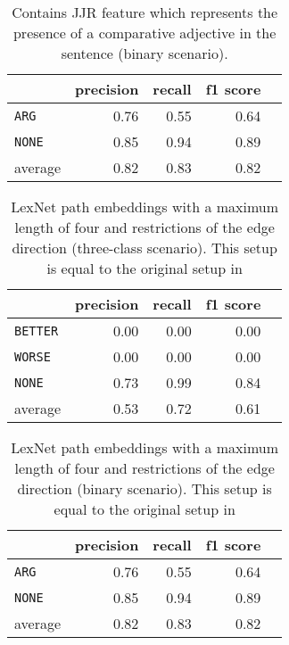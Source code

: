 \begin{table}[h] 
	\centering 
	\caption{Contains JJR feature which represents the presence of a comparative adjective in the sentence (binary scenario).} 
	\begin{tabular}{@{}lrrrr@{}}
		\toprule
		                & precision & recall & f1 score \\ \midrule 
		\texttt{ARG}    & 0.76      & 0.55   & 0.64     \\ 
		\texttt{NONE}   & 0.85      & 0.94   & 0.89     \\ 
		average         & 0.82      & 0.83   & 0.82     \\ 			\bottomrule
	\end{tabular}
\end{table}




\begin{table}[htbp] 
	\centering 
	\caption{LexNet path embeddings with a maximum length of four and restrictions of the edge direction (three-class scenario). This setup is equal to the original setup in \cite{DBLP:journals/corr/ShwartzD16}} 
	\begin{tabular}{@{}lrrrr@{}}
		\toprule
		                & precision & recall & f1 score \\ \midrule 
		\texttt{BETTER} & 0.00      & 0.00   & 0.00     \\ 
		\texttt{WORSE}  & 0.00      & 0.00   & 0.00     \\ 
		\texttt{NONE}   & 0.73      & 0.99   & 0.84     \\ 
		average         & 0.53      & 0.72   & 0.61     \\ 			\bottomrule
	\end{tabular}
\end{table}

\begin{table}[htbp] 
	\centering 
	\caption{LexNet path embeddings with a maximum length of four and restrictions of the edge direction (binary scenario). This setup is equal to the original setup in \cite{DBLP:journals/corr/ShwartzD16}} 
	\begin{tabular}{@{}lrrrr@{}}
		\toprule
		                & precision & recall & f1 score \\ \midrule 
		\texttt{ARG}    & 0.76      & 0.55   & 0.64     \\ 
		\texttt{NONE}   & 0.85      & 0.94   & 0.89     \\ 
		average         & 0.82      & 0.83   & 0.82     \\ 			\bottomrule
	\end{tabular}
\end{table}




